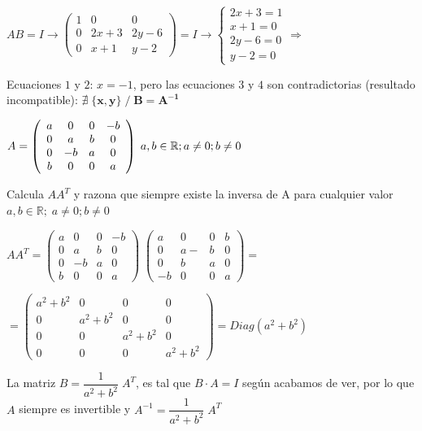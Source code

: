 \begin{proofw}\renewcommand{\qedsymbol}{$\diamond$}
	
	$AB=I \to  \left( \begin{array}{ccc}  1&0&0\\ 0&2x+3&2y-6\\0&x+1&y-2  \end{array} \right) = I \to \begin{cases} 2x+3=1\\x+1=0\\2y-6=0\\y-2=0  \end{cases} \Rightarrow$
	
	Ecuaciones $1$ y $2$: $x=-1$, pero las ecuaciones $3$ y $4$ son contradictorias (resultado incompatible): $\boldsymbol{\nexists \; \{x,y\} \; / \; B=A^{-1}}$
	
\end{proofw}

\begin{ejre}
$A=\left( \begin{array}{cccc} a&0&0&-b\\0&a&b&0\\0&-b&a&0\\b&0&0&a    \end{array} \right) \; \small{a,b\in \mathbb R; a\neq 0; b\neq 0}$ 

\noindent \normalsize{Calcula} $AA^T$ y razona que siempre existe la inversa de A para cualquier valor $a,b\in \mathbb R; \; a\neq 0; b\neq 0$
\end{ejre}

\begin{proofw}\renewcommand{\qedsymbol}{$\diamond$}

$AA^T=\left( \begin{array}{cccc} a&0&0&-b\\0&a&b&0\\0&-b&a&0\\b&0&0&a    \end{array} \right) \; 
\left( \begin{array}{cccc} a&0&0&b\\0&a-&b&0\\0&b&a&0\\-b&0&0&a    \end{array} \right) =$

$= \left( \begin{array}{cccc} a^2+b^2&0&0&0\\0&a^2+b^2&0&0\\0&0&a^2+b^2&0\\0&0&0&a^2+b^2    \end{array} \right) =Diag(a^2+b^2)$

La matriz $B=\dfrac 1 {a^2+b^2}\; A^T$, es tal que $B\cdot A=I$ según acabamos de ver, por lo que $A$ siempre es invertible y $A^{-1}=\dfrac 1 {a^2+b^2}\; A^T$
	
\end{proofw}


